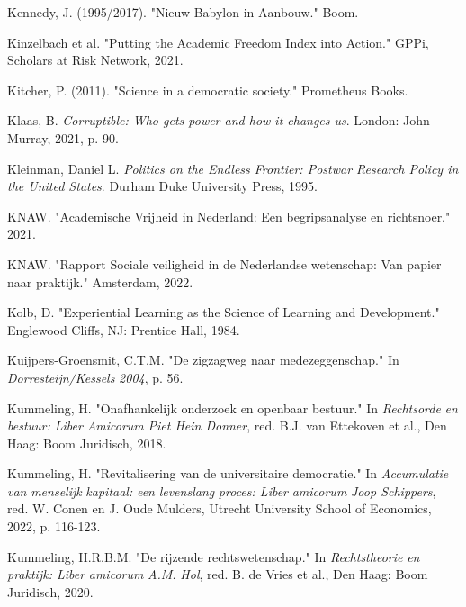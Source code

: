 \documentclass[smallauthor, chapterhaspagenum, nochapterinheader, pagenuminheader,  bigchapnum,medium2, tocpages,  garamond, titleinheader]{jote-book}
\begin{document}
\begin{references}
		Kennedy, J. (1995/2017). "Nieuw Babylon in Aanbouw." Boom.



		Kinzelbach et al. "Putting the Academic Freedom Index into Action." GPPi, Scholars at Risk Network, 2021.



		Kitcher, P. (2011). "Science in a democratic society." Prometheus Books.



		Klaas, B. \emph{Corruptible: Who gets power and how it changes us}. London: John Murray, 2021, p. 90.



		Kleinman, Daniel L. \emph{Politics on the Endless Frontier: Postwar Research Policy in the United States}. Durham Duke University Press, 1995.



		KNAW. "Academische Vrijheid in Nederland: Een begripsanalyse en richtsnoer." 2021.



		KNAW. "Rapport Sociale veiligheid in de Nederlandse wetenschap: Van papier naar praktijk." Amsterdam, 2022.



		Kolb, D. "Experiential Learning as the Science of Learning and Development." Englewood Cliffs, NJ: Prentice Hall, 1984.



		Kuijpers-Groensmit, C.T.M. "De zigzagweg naar medezeggenschap." In \emph{Dorresteijn}\emph{/}\emph{Kessels}\emph{ 2004}, p. 56.



		Kummeling, H. "Onafhankelijk onderzoek en openbaar bestuur." In \emph{Rechtsorde}\emph{ }\emph{en}\emph{ }\emph{bestuur}\emph{: Liber }\emph{Amicorum}\emph{ Piet Hein Donner}, red. B.J. van Ettekoven et al., Den Haag: Boom Juridisch, 2018.



		Kummeling, H. "Revitalisering van de universitaire democratie." In \emph{Accumulatie}\emph{ van }\emph{menselijk}\emph{ }\emph{kapitaal}\emph{: }\emph{een}\emph{ }\emph{levenslang}\emph{ }\emph{proces}\emph{: Liber }\emph{amicorum}\emph{ Joop Schippers}, red. W. Conen en J. Oude Mulders, Utrecht University School of Economics, 2022, p. 116-123.



		Kummeling, H.R.B.M. "De rijzende rechtswetenschap." In \emph{Rechtstheorie}\emph{ }\emph{en}\emph{ }\emph{praktijk}\emph{: Liber }\emph{amicorum}\emph{ A.M. }\emph{Hol}, red. B. de Vries et al., Den Haag: Boom Juridisch, 2020.




\end{references}
\end{document}

